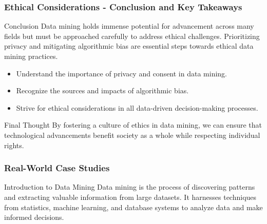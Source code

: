 \documentclass[aspectratio=169]{beamer}
\begin{document}
\begin{frame}[fragile]
    \frametitle{Ethical Considerations - Conclusion and Key Takeaways}
    \begin{block}{Conclusion}
        Data mining holds immense potential for advancement across many fields but must be approached carefully to address ethical challenges. Prioritizing privacy and mitigating algorithmic bias are essential steps towards ethical data mining practices.
    \end{block}
    
    \begin{itemize}
        \item Understand the importance of privacy and consent in data mining.
        \item Recognize the sources and impacts of algorithmic bias.
        \item Strive for ethical considerations in all data-driven decision-making processes.
    \end{itemize}
    
    \begin{block}{Final Thought}
        By fostering a culture of ethics in data mining, we can ensure that technological advancements benefit society as a whole while respecting individual rights.
    \end{block}
\end{frame}

\begin{frame}[fragile]
    \frametitle{Real-World Case Studies}
    \begin{block}{Introduction to Data Mining}
        Data mining is the process of discovering patterns and extracting valuable information from large datasets. It harnesses techniques from statistics, machine learning, and database systems to analyze data and make informed decisions.
    \end{block}
\end{frame}
\end{document}

